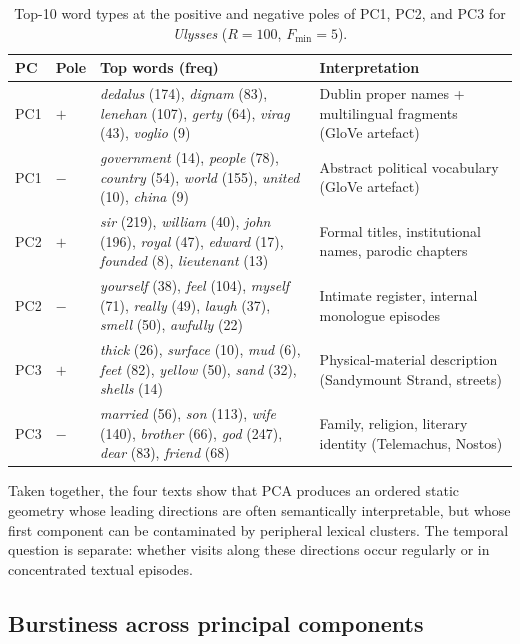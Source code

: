 \documentclass[12pt,a4paper]{article}
\begin{document}
\begin{table}[htbp]
\centering
\caption{Top-10 word types at the positive and negative poles
of PC1, PC2, and PC3 for \emph{Ulysses} ($R=100$, $F_{\min}=5$).}
\label{tab:ulysses_pc}
\small
\setlength{\tabcolsep}{4pt}
\begin{tabular}{ll p{6.2cm} p{5.3cm}}
\toprule
PC & Pole & Top words (freq) & Interpretation \\
\midrule
PC1 & $+$ &
  \emph{dedalus} (174), \emph{dignam} (83),
  \emph{lenehan} (107), \emph{gerty} (64),
  \emph{virag} (43), \emph{voglio} (9)
  & Dublin proper names + multilingual fragments (GloVe artefact) \\
PC1 & $-$ &
  \emph{government} (14), \emph{people} (78),
  \emph{country} (54), \emph{world} (155),
  \emph{united} (10), \emph{china} (9)
  & Abstract political vocabulary (GloVe artefact) \\
\midrule
PC2 & $+$ &
  \emph{sir} (219), \emph{william} (40), \emph{john} (196),
  \emph{royal} (47), \emph{edward} (17),
  \emph{founded} (8), \emph{lieutenant} (13)
  & Formal titles, institutional names, parodic chapters \\
PC2 & $-$ &
  \emph{yourself} (38), \emph{feel} (104),
  \emph{myself} (71), \emph{really} (49),
  \emph{laugh} (37), \emph{smell} (50), \emph{awfully} (22)
  & Intimate register, internal monologue episodes \\
\midrule
PC3 & $+$ &
  \emph{thick} (26), \emph{surface} (10), \emph{mud} (6),
  \emph{feet} (82), \emph{yellow} (50),
  \emph{sand} (32), \emph{shells} (14)
  & Physical-material description (Sandymount Strand, streets) \\
PC3 & $-$ &
  \emph{married} (56), \emph{son} (113), \emph{wife} (140),
  \emph{brother} (66), \emph{god} (247),
  \emph{dear} (83), \emph{friend} (68)
  & Family, religion, literary identity (Telemachus, Nostos) \\
\bottomrule
\end{tabular}
\end{table}

Taken together, the four texts show that PCA produces an ordered static
geometry whose leading directions are often semantically interpretable,
but whose first component can be contaminated by peripheral lexical
clusters. The temporal question is separate: whether visits along these
directions occur regularly or in concentrated textual episodes.

\FloatBarrier
\subsection{Burstiness across principal components}
\label{sec:component_burstiness_results}
\end{document}
